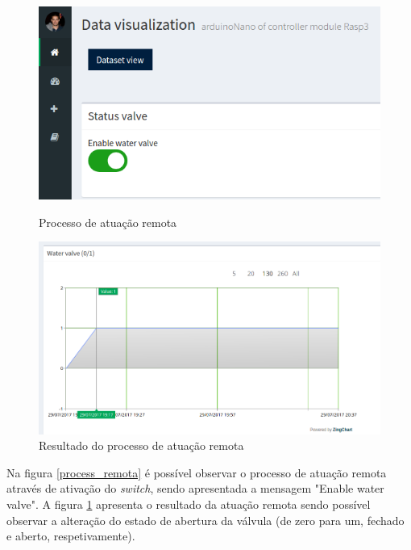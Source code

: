 \begin{figure}[h]
	\centering
	\begin{minipage}[b]{0.495\textwidth}
		\centering
		\includegraphics[width=\textwidth]{prints-web/onstatus.png}
		\caption[Processo de atuação remota]{Processo de atuação remota \newline}
		\label{process_remota}
	\end{minipage}
	\hfill
	\begin{minipage}[b]{0.495\textwidth}
		\centering
		\includegraphics[width=\textwidth]{prints-web/viewstatus.png}
		\caption{Resultado do processo de atuação remota}
		\label{resutl_remota}
	\end{minipage}
\end{figure}


Na figura \ref{process_remota} é possível observar o processo de atuação remota através de ativação do \textit{switch}, sendo apresentada a mensagem "Enable water valve". A figura \ref{resutl_remota} apresenta o resultado da atuação remota sendo possível observar a alteração do estado de abertura da válvula (de zero para um, fechado e aberto, respetivamente).  

